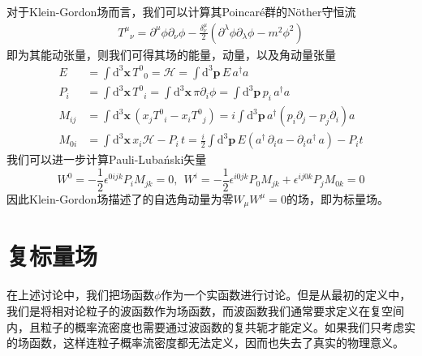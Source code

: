 对于Klein-Gordon场而言，我们可以计算其Poincaré群的Nöther守恒流
\begin{gather}
    {T^\mu}_\nu = \partial^\mu \phi\partial_\nu\phi - \frac{\delta^\mu_\nu}{2}(\partial^\lambda\phi\partial_\lambda\phi - m^2\phi^2)
\end{gather}
即为其能动张量，则我们可得其场的能量，动量，以及角动量张量
\begin{align}
    E &= \int\mathrm{d}^3\boldsymbol{x} \,{T^0}_0 = \mathcal{H}=\int\mathrm{d}^3\boldsymbol{p}\, E \,a^\dagger a\\
    P_i &= \int\mathrm{d}^3\boldsymbol{x}\, {T^0}_i = \int\mathrm{d}^3\boldsymbol{x}\, \pi\partial_i\phi =\int\mathrm{d}^3\boldsymbol{p}\,p_i\, a^\dagger a\\
    M_{ij}&=\int\mathrm{d}^3\boldsymbol{x}\,(x_j {T^0}_i-x_i {T^0}_j)=i\int\mathrm{d}^3\boldsymbol{p}\,a^\dagger (p_i\partial_j - p_j\partial_i)a\\
    M_{0i} &= \int\mathrm{d}^3\boldsymbol{x}\, x_i\mathscr{H} - P_i \,t =\frac{i}{2} \int\mathrm{d}^3\boldsymbol{p}\, E(a^\dagger\,\partial_ia -\partial_i a^\dagger\, a) - P_i t
\end{align}
我们可以进一步计算Pauli-Luba\'nski矢量
\begin{equation}
    W^0 = -\frac{1}{2}\epsilon^{0ijk}P_i M_{jk}=0,~~W^{i} = -\frac{1}{2}\epsilon^{i0jk}P_0 M_{jk}+\epsilon^{ij0k}P_jM_{0k}=0
\end{equation}
因此Klein-Gordon场描述了的自选角动量为零$W_\mu W^\mu =0$的场，即为标量场。

\section{复标量场}
在上述讨论中，我们把场函数$\phi$作为一个实函数进行讨论。但是从最初的定义中，我们是将相对论粒子的波函数作为场函数，而波函数我们通常要求定义在复空间内，且粒子的概率流密度也需要通过波函数的复共轭才能定义。如果我们只考虑实的场函数，这样连粒子概率流密度都无法定义，因而也失去了真实的物理意义。

